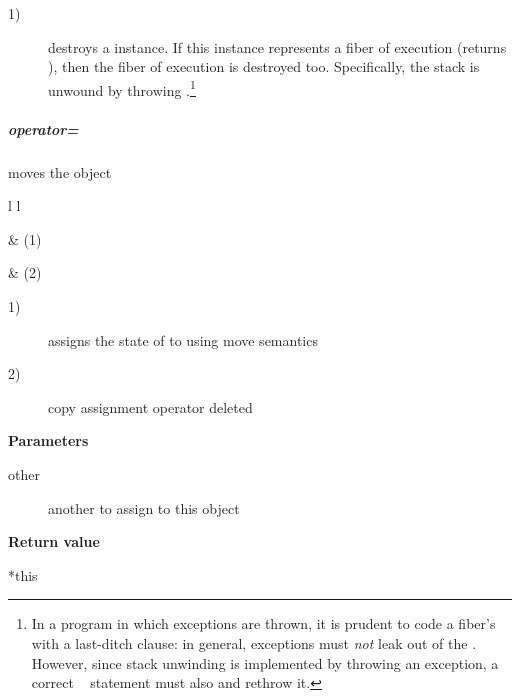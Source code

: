 \begin{description}
    \item[1)] destroys a \xtfiber instance. If this instance represents a fiber
              of execution (\opbool returns ), then the fiber of
              execution is destroyed too. Specifically, the stack is unwound
              by throwing \unwindex.\footnote{ In a program in which exceptions
              are thrown, it is prudent to code a fiber's \entryfn\xspace with a
              last-ditch  clause: in general, exceptions must
              \emph{not} leak out of the \entryfn. However, since stack
              unwinding is implemented by throwing an exception, a correct
              \entryfn\  statement must also
               and rethrow it.}
\end{description}


\subparagraph*{operator=}
moves the \xtfiber object\\

\begin{tabular}{ l l }
    \midrule

     & (1)\\

    \midrule

     & (2)\\

    \midrule
\end{tabular}

\begin{description}
    \item[1)] assigns the state of  to  using move semantics
    \item[2)] copy assignment operator deleted
\end{description}

{\bfseries Parameters}
\begin{description}
    \item[other]   another \xtfiber to assign to this object\\
\end{description}

{\bfseries Return value}
\begin{description}
    \item[*this]
\end{description}


